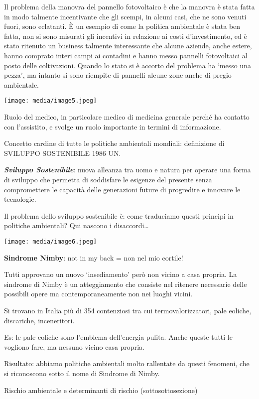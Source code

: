 \documentclass[]{article}
\begin{document}
Il problema della manovra del pannello fotovoltaico è che la manovra è
stata fatta in modo talmente incentivante che gli scempi, in alcuni
casi, che ne sono venuti fuori, sono eclatanti. È un esempio di come la
politica ambientale è stata ben fatta, non si sono misurati gli
incentivi in relazione ai costi d'investimento, ed è stato ritenuto un
business talmente interessante che alcune aziende, anche estere, hanno
comprato interi campi ai contadini e hanno messo pannelli fotovoltaici
al posto delle coltivazioni. Quando lo stato si è accorto del problema
ha `messo una pezza', ma intanto si sono riempite di pannelli alcune
zone anche di pregio ambientale.

\texttt{[image: media/image5.jpeg]}

Ruolo del medico, in particolare medico di medicina generale perché ha
contatto con l'assistito, e svolge un ruolo importante in termini di
informazione.

Concetto cardine di tutte le politiche ambientali mondiali: definizione
di SVILUPPO SOSTENIBILE 1986 UN.

\textbf{\emph{Sviluppo Sostenibile}}: nuova alleanza tra uomo e natura
per operare una forma di sviluppo che permetta di soddisfare le esigenze
del presente senza compromettere le capacità delle generazioni future di
progredire e innovare le tecnologie.

Il problema dello sviluppo sostenibile è: come traduciamo questi
principi in politiche ambientali? Qui nascono i disaccordi\ldots{}

\texttt{[image: media/image6.jpeg]}

\textbf{Sindrome Nimby}: not in my back = non nel mio cortile!

Tutti approvano un nuovo `insediamento' però non vicino a casa propria.
La sindrome di Nimby è un atteggiamento che consiste nel ritenere
necessarie delle possibili opere ma contemporaneamente non nei luoghi
vicini.

Si trovano in Italia più di 354 contenziosi tra cui termovalorizzatori,
pale eoliche, discariche, inceneritori.

Es: le pale eoliche sono l'emblema dell'energia pulita. Anche queste
tutti le vogliono fare, ma nessuno vicino casa propria.

Risultato: abbiamo politiche ambientali molto rallentate da questi
fenomeni, che si riconoscono sotto il nome di Sindrome di Nimby.

Rischio ambientale e determinanti di rischio (sottosottosezione)
\end{document}

